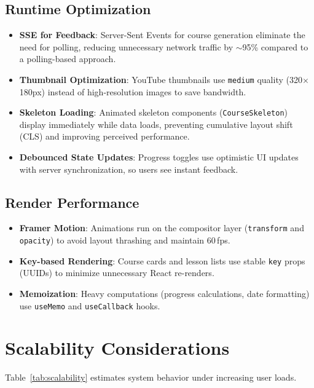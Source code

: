 \documentclass[12pt,a4paper]{report}
\begin{document}
\subsection{Runtime Optimization}
\begin{itemize}[noitemsep]
    \item \textbf{SSE for Feedback}: Server-Sent Events for course generation eliminate the need for polling, reducing unnecessary network traffic by $\sim$95\% compared to a polling-based approach.
    \item \textbf{Thumbnail Optimization}: YouTube thumbnails use \texttt{medium} quality (320$\times$180px) instead of high-resolution images to save bandwidth.
    \item \textbf{Skeleton Loading}: Animated skeleton components (\texttt{CourseSkeleton}) display immediately while data loads, preventing cumulative layout shift (CLS) and improving perceived performance.
    \item \textbf{Debounced State Updates}: Progress toggles use optimistic UI updates with server synchronization, so users see instant feedback.
\end{itemize}

\subsection{Render Performance}
\begin{itemize}[noitemsep]
    \item \textbf{Framer Motion}: Animations run on the compositor layer (\texttt{transform} and \texttt{opacity}) to avoid layout thrashing and maintain 60\,fps.
    \item \textbf{Key-based Rendering}: Course cards and lesson lists use stable \texttt{key} props (UUIDs) to minimize unnecessary React re-renders.
    \item \textbf{Memoization}: Heavy computations (progress calculations, date formatting) use \texttt{useMemo} and \texttt{useCallback} hooks.
\end{itemize}

\section{Scalability Considerations}
Table~\ref{tab:scalability} estimates system behavior under increasing user loads.
\end{document}
